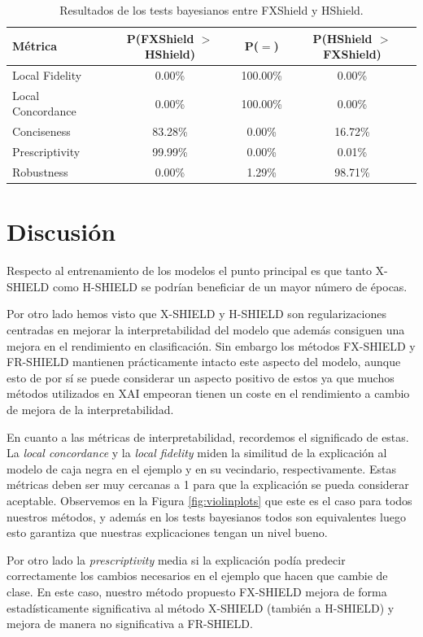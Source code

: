 \begin{table}[ht]
\centering
\begin{tabular}{lccc}
\toprule
\textbf{Métrica} & \textbf{P(FXShield $>$ HShield)} & \textbf{P($=$)} & \textbf{P(HShield $>$ FXShield)} \\
\midrule
Local Fidelity    & 0.00\%  & 100.00\% & 0.00\%  \\
Local Concordance & 0.00\%  & 100.00\% & 0.00\%  \\
Conciseness       & 83.28\% & 0.00\%  & 16.72\%  \\
Prescriptivity    & 99.99\% & 0.00\%  & 0.01\%  \\
Robustness        & 0.00\% & 1.29\% & 98.71\% \\
\bottomrule
\end{tabular}
\caption{Resultados de los tests bayesianos entre FXShield y HShield.}
\label{tab:bay-FX-H}
\end{table}


\section{Discusión} \label{sec:discusion}

Respecto al entrenamiento de los modelos el punto principal es que tanto X-SHIELD como H-SHIELD se podrían beneficiar de un mayor número de épocas.

Por otro lado hemos visto que X-SHIELD y H-SHIELD son regularizaciones centradas en mejorar la interpretabilidad del modelo que además consiguen una mejora en el rendimiento en clasificación. Sin embargo los métodos FX-SHIELD y FR-SHIELD mantienen prácticamente intacto este aspecto del modelo, aunque esto de por sí se puede considerar un aspecto positivo de estos ya que muchos métodos utilizados en XAI empeoran tienen un coste en el rendimiento a cambio de mejora de la interpretabilidad.

En cuanto a las métricas de interpretabilidad, recordemos el significado de estas. La \textit{local concordance} y la \textit{local fidelity} miden la similitud de la explicación al modelo de caja negra en el ejemplo y en su vecindario, respectivamente. Estas métricas deben ser muy cercanas a 1 para que la explicación se pueda considerar aceptable. Observemos en la Figura \ref{fig:violinplots} que este es el caso para todos nuestros métodos, y además en los tests bayesianos todos son equivalentes luego esto garantiza que nuestras explicaciones tengan un nivel bueno.

Por otro lado la \textit{prescriptivity} media si la explicación podía predecir correctamente los cambios necesarios en el ejemplo que hacen que cambie de clase. En este caso, nuestro método propuesto FX-SHIELD mejora de forma estadísticamente significativa al método X-SHIELD (también a H-SHIELD) y mejora de manera no significativa a FR-SHIELD. 

